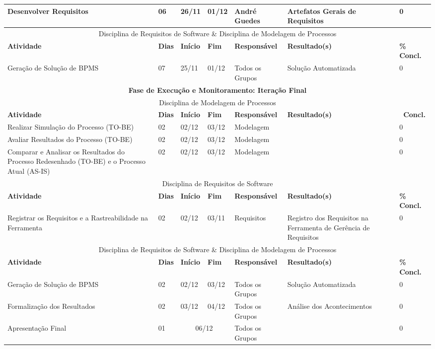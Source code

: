 \begin{landscape}
\begin{center}
\begin{tabular}{|m{6cm}|m{1cm}|m{1cm}|m{1cm}|m{4cm}|m{6cm}|m{2cm}|}
			\end{tabular}
		\end{center}
		\begin{center}
			\begin{tabular}{|m{6cm}|m{1cm}|m{1cm}|m{1cm}|m{4cm}|m{6cm}|m{2cm}|}
			\hline
			Desenvolver Requisitos & 06 & 26/11 & 01/12 & André Guedes & Artefatos Gerais de Requisitos & 0 \\ \hline
			\multicolumn{7}{|c|}{Disciplina de Requisitos de Software \& Disciplina de Modelagem de Processos} \\ \hline
			\textbf{Atividade} & \textbf{Dias} & \textbf{Início} & \textbf{Fim} & \textbf{Responsável} & \textbf{Resultado(s)} & \textbf{\% Concl.} \\ \hline
			Geração de Solução de BPMS & 07 & 25/11 & 01/12 & Todos os Grupos & Solução Automatizada & 0 \\ \hline
			\multicolumn{7}{|c|}{\textbf{Fase de Execução e Monitoramento: Iteração Final}} \\
			\hline
			\multicolumn{7}{|c|}{Disciplina de Modelagem de Processos} \\
			\hline
			\textbf{Atividade} & \textbf{Dias} & \textbf{Início} & \textbf{Fim} & \textbf{Responsável} & \textbf{Resultado(s)} & \textbf{\ Concl.} \\ \hline
			Realizar Simulação do Processo (TO-BE) & 02 & 02/12 & 03/12 & Modelagem & & 0 \\ \hline
			Avaliar Resultados do Processo (TO-BE) & 02 & 02/12 & 03/12 & Modelagem & & 0 \\ \hline
			Comparar e Analisar os Resultados do Processo Redesenhado (TO-BE) e o Processo Atual (AS-IS) & 02 & 02/12 & 03/12 & Modelagem & & 0 \\ \hline
			\multicolumn{7}{|c|}{Disciplina de Requisitos de Software} \\
			\hline
			\textbf{Atividade} & \textbf{Dias} & \textbf{Início} & \textbf{Fim} & \textbf{Responsável} & \textbf{Resultado(s)} & \textbf{\% Concl.} \\ \hline
			Registrar os Requisitos e a Rastreabilidade na Ferramenta & 02 & 02/12 & 03/11 & Requisitos & Registro dos Requisitos na Ferramenta de Gerência de Requisitos & 0 \\ \hline
			\multicolumn{7}{|c|}{Disciplina de Requisitos de Software \& Disciplina de Modelagem de Processos} \\ \hline
			\textbf{Atividade} & \textbf{Dias} & \textbf{Início} & \textbf{Fim} & \textbf{Responsável} & \textbf{Resultado(s)} & \textbf{\% Concl.} \\ \hline
			Geração de Solução de BPMS & 02 & 02/12 & 03/12 & Todos os Grupos & Solução Automatizada & 0 \\ \hline
			Formalização dos Resultados & 02 & 03/12 & 04/12 & Todos os Grupos & Análise dos Acontecimentos & 0 \\ \hline
			Apresentação Final & 01 & \multicolumn{2}{c|}{06/12} & Todos os Grupos & & 0 \\ \hline
			\end{tabular}
		\end{center}
	\end{landscape}
